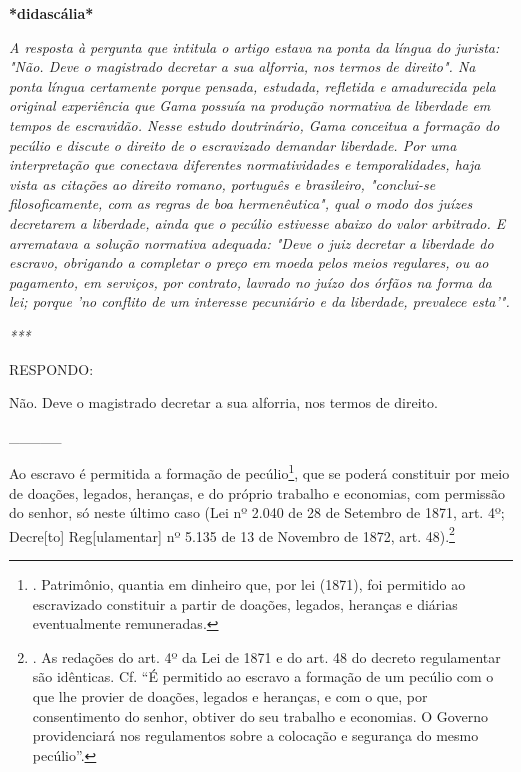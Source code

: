 \textbf{*didascália*}

\emph{A resposta à pergunta que intitula o artigo estava na ponta da
língua do jurista: "Não. Deve o magistrado decretar a sua alforria, nos
termos de direito". Na ponta língua certamente porque pensada, estudada,
refletida e amadurecida pela original experiência que Gama possuía na
produção normativa de liberdade em tempos de escravidão. Nesse estudo
doutrinário, Gama conceitua a formação do pecúlio e discute o direito de
o escravizado demandar liberdade. Por uma interpretação que conectava
diferentes normatividades e temporalidades, haja vista as citações ao
direito romano, português e brasileiro, "conclui-se filosoficamente, com
as regras de boa hermenêutica", qual o modo dos juízes decretarem a
liberdade, ainda que o pecúlio estivesse abaixo do valor arbitrado. E
arrematava a solução normativa adequada: "Deve o juiz decretar a
liberdade do escravo, obrigando a completar o preço em moeda pelos meios
regulares, ou ao pagamento, em serviços, por contrato, lavrado no juízo
dos órfãos na forma da lei; porque 'no conflito de um interesse
pecuniário e da liberdade, prevalece esta'". }

\emph{***}

RESPONDO:

Não. Deve o magistrado decretar a sua alforria, nos termos de direito.

\_\_\_\_\_

Ao escravo é permitida a formação de pecúlio\footnote{. Patrimônio,
  quantia em dinheiro que, por lei (1871), foi permitido ao escravizado
  constituir a partir de doações, legados, heranças e diárias
  eventualmente remuneradas.}, que se poderá constituir por meio de
doações, legados, heranças, e do próprio trabalho e economias, com
permissão do senhor, só neste último caso (Lei nº 2.040 de 28 de
Setembro de 1871, art. 4º; Decre{[}to{]} Reg{[}ulamentar{]} nº 5.135 de
13 de Novembro de 1872, art. 48).\footnote{. As redações do art. 4º da
  Lei de 1871 e do art. 48 do decreto regulamentar são idênticas. Cf.
  ``É permitido ao escravo a formação de um pecúlio com o que lhe
  provier de doações, legados e heranças, e com o que, por consentimento
  do senhor, obtiver do seu trabalho e economias. O Governo
  providenciará nos regulamentos sobre a colocação e segurança do mesmo
  pecúlio''.}

